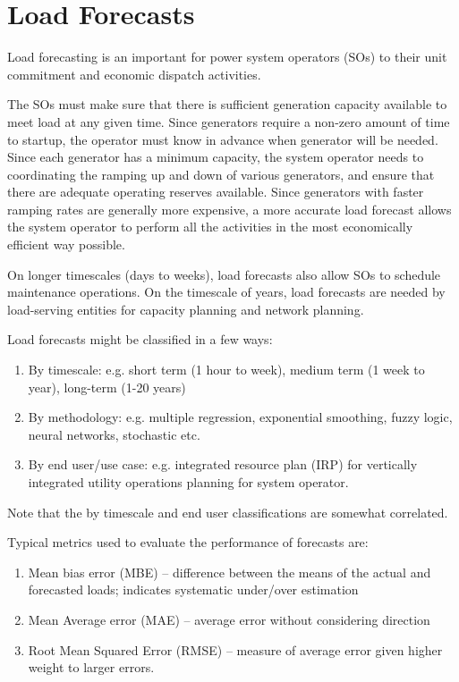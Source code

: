 \documentclass{homework}
\begin{document}
\section{Load Forecasts}
\begin{letterenum}
    \item Load forecasting is an important for power system operators (SOs) to their
    unit commitment and economic dispatch activities.

    The SOs must make sure that there is sufficient generation capacity
    available to meet load at any given time. Since generators require a non-zero
    amount of time to startup, the operator must know in advance when generator will
    be needed. Since each generator has a minimum capacity, the system
    operator needs to coordinating the ramping up and down of various generators,
    and ensure that there are adequate operating reserves available. Since generators
    with faster ramping rates are generally more expensive, a more accurate load
    forecast allows the system operator to perform all the activities in the most
    economically efficient way possible.

    On longer timescales (days to weeks), load forecasts also allow SOs to schedule maintenance
    operations. On the timescale of years, load forecasts are needed by load-serving
    entities for capacity planning and network planning.

    \item Load forecasts might be classified in a few ways:
     \begin{enumerate}
        \item By timescale: e.g. short term (1 hour to week), medium term (1 week to year), long-term (1-20 years)
        \item By methodology: e.g. multiple regression, exponential smoothing, fuzzy logic, neural networks, stochastic etc.
        \item By end user/use case: e.g. integrated resource plan (IRP) for vertically integrated utility
            operations planning for system operator.
     \end{enumerate}
     Note that the by timescale and end user classifications are somewhat correlated.

    \item Typical metrics used to evaluate the performance of forecasts are:
    \begin{enumerate}
        \item Mean bias error (MBE) -- difference between the means of the
            actual and forecasted loads; indicates systematic under/over estimation
        \item Mean Average error (MAE) -- average error without considering direction
        \item Root Mean Squared Error (RMSE) -- measure of average error given higher
            weight to larger errors.
    \end{enumerate}


\end{letterenum}
\end{document}
